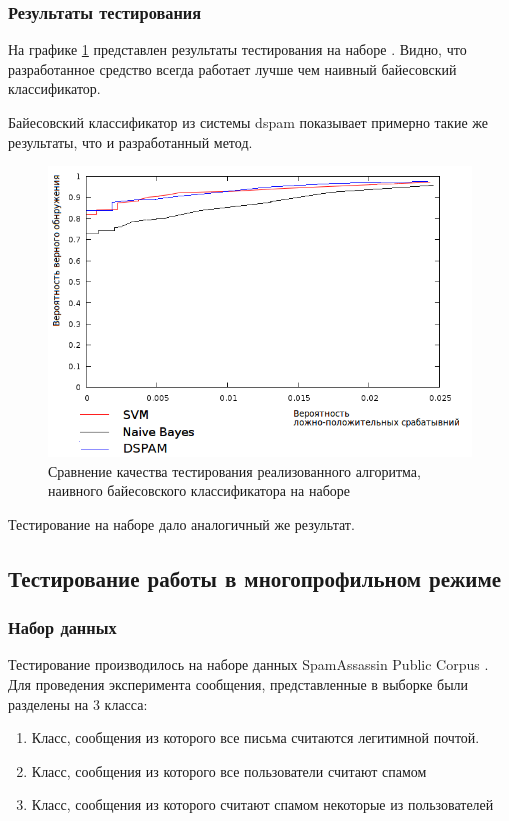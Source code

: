 \subsubsection{Результаты тестирования}
На графике \ref{SAPCBAYESSVM}  представлен результаты тестирования на наборе \cite{SAPC}. Видно, что разработанное средство всегда работает лучше чем наивный байесовский классификатор.

Байесовский классификатор из системы dspam показывает примерно такие же результаты, что и разработанный метод.
\begin{figure}[h]
\begin{center}
\includegraphics[width=15cm]{img/graphic}
\end{center}
\caption{Сравнение качества тестирования реализованного алгоритма, наивного байесовского классификатора на наборе\cite{SAPC}}
\label{SAPCBAYESSVM}
\end{figure}

Тестирование на наборе \cite{CEAS} дало аналогичный же результат.

\subsection{Тестирование работы в многопрофильном режиме}

\subsubsection{Набор данных}
Тестирование производилось на наборе данных SpamAssassin Public Corpus \cite{SAPC}.
Для проведения эксперимента сообщения, представленные в выборке были разделены на 3 класса:
\begin{enumerate}
\item Класс, сообщения из которого все письма считаются легитимной почтой.
\item Класс, сообщения из которого все пользователи считают спамом
\item Класс, сообщения из которого считают спамом некоторые из пользователей
\end{enumerate}


